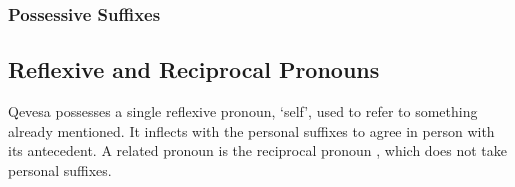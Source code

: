 \documentclass[grammar]{subfiles}
\begin{document}
  \subsubsection{Possessive Suffixes}
  \label{sssec:mn_possessive_suffixes}

  \ToBeWritten

  \newpage
  \subsection{Reflexive and Reciprocal Pronouns}
  \label{ssec:nm_reflexive_pronouns}

   Qevesa possesses a single reflexive pronoun,  ‘self’, used to refer to something already mentioned.  It inflects with the personal suffixes to agree in person with its antecedent. 
   A related pronoun is the reciprocal pronoun , which does not take personal suffixes.

\end{document}
